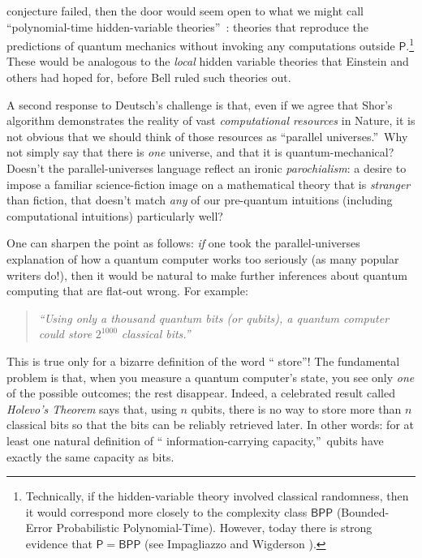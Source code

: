 \documentclass[12pt,onecolumn]{article}%
\begin{document}
conjecture failed, then the door would seem open to what we might call
\textquotedblleft polynomial-time hidden-variable theories\textquotedblright\ :
theories that reproduce the predictions of quantum mechanics without invoking
any computations outside $\mathsf{P}$.\footnote{Technically, if the
hidden-variable theory involved classical randomness, then it would correspond
more closely to the complexity class $\mathsf{BPP}$ (Bounded-Error
Probabilistic Polynomial-Time). However, today there is strong evidence that
$\mathsf{P}=\mathsf{BPP}$ (see Impagliazzo and Wigderson \cite{iw}).} These
would be analogous to the \textit{local} hidden variable theories that
Einstein and others had hoped for, before Bell ruled such theories out.

A second response to Deutsch's challenge is that, even if we agree that Shor's
algorithm demonstrates the reality of vast \textit{computational resources} in
Nature, it is not obvious that we should think of those resources as
\textquotedblleft parallel universes.\textquotedblright\  Why not simply say
that there is \textit{one} universe, and that it is quantum-mechanical?
 Doesn't the parallel-universes language reflect an ironic
\textit{parochialism}: a desire to impose a familiar science-fiction image on
a mathematical theory that is \textit{stranger} than fiction, that doesn't
match \textit{any} of our pre-quantum intuitions (including computational
intuitions) particularly well?

One can sharpen the point as follows: \textit{if} one took the
parallel-universes explanation of how a quantum computer works too seriously
(as many popular writers do!), then it would be natural to make further
inferences about quantum computing that are flat-out wrong. For example:

\begin{quotation}
\noindent\textit{\textquotedblleft Using only a thousand quantum bits (or
qubits), a quantum computer could store }$2^{1000}$\textit{ classical
bits.\textquotedblright\ }
\end{quotation}

This is true only for a bizarre definition of the word \textquotedblleft
store\textquotedblright ! The fundamental problem is that, when you measure a
quantum computer's state, you see only \textit{one} of the possible outcomes;
the rest disappear. Indeed, a celebrated result called \textit{Holevo's
Theorem} \cite{holevo} says that, using $n$ qubits, there is no way to store
more than $n$ classical bits so that the bits can be reliably retrieved later.
 In other words: for at least one natural definition of \textquotedblleft
information-carrying capacity,\textquotedblright\  qubits have exactly the same
capacity as bits.
\end{document}
